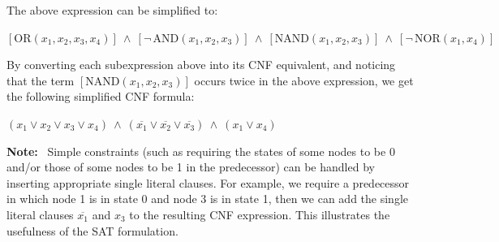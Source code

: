\smallskip

\noindent
The above expression can be simplified to:

\begin{center}
$[\mathrm{OR}(x_1, x_2, x_3, x_4)] ~\wedge~
[\neg\,\mathrm{AND}(x_1, x_2, x_3)] ~\wedge~ 
[\mathrm{NAND}(x_1, x_2, x_3)] ~\wedge~
[\neg\,\mathrm{NOR}(x_1, x_4)]$
\end{center}

\noindent
By converting each subexpression above into its CNF equivalent, and
noticing that the term $[\mathrm{NAND}(x_1, x_2, x_3)]$ occurs twice
in the above expression, we get the following simplified
CNF formula:

\begin{center}
$(x_1 \vee  x_2 \vee  x_3 \vee  x_4)  ~\wedge~
(\overline{x_1} \vee \overline{x_2} \vee \overline{x_3}) ~\wedge~ 
(x_1 \vee x_4)$
\end{center}


\noindent
\textbf{Note:}~ Simple constraints (such as requiring
the states of some nodes to be 0 and/or those of some nodes to be 1
in the predecessor) can be handled by inserting appropriate 
single literal clauses.
For example, we require a predecessor in which node 1 is in state 0
and node 3 is in state 1, then we can add the single literal clauses
$\overline{x_1}$ and $x_3$ to the resulting CNF expression.
This illustrates the usefulness of the SAT formulation.
